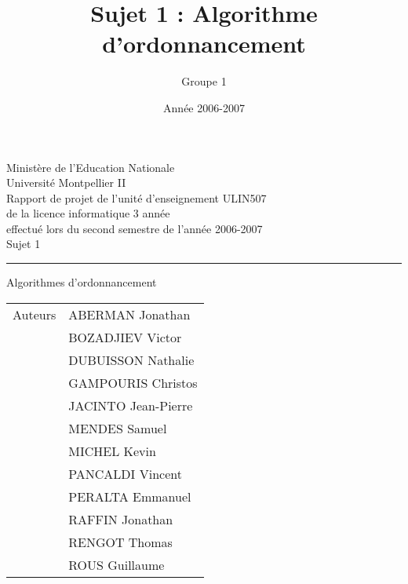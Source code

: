 \documentclass[A4]{report}
\title{Sujet 1 : Algorithme d'ordonnancement}
\author{Groupe 1}
\date{Année 2006-2007}
\theoremstyle{remark}
\newcommand{\sups}[1]{\raisebox{1ex}{\small #1}}
\begin{document}
\begin{titlepage}
\begin{center}
{\large
Ministère de l'Education Nationale \\
\vspace{0.8cm}
Université Montpellier II \\
\vspace{1.5cm}
Rapport de projet de l'unité d'enseignement ULIN507 \\
de la licence informatique 3\sups{ème} année \\
effectué lors du second semestre de l'année 2006-2007 \\
}
\vspace{4cm}
{\huge Sujet 1 }\\
\vspace{0.2cm}
\hrule
\vspace{0.2cm}
{\Huge Algorithmes d'ordonnancement}
\vspace{7cm}
\end{center}
\begin{flushright}
{\raggedleft
\begin{tabular}{r|l}
Auteurs & ABERMAN Jonathan \\
& BOZADJIEV Victor \\
& DUBUISSON Nathalie \\
& GAMPOURIS Christos \\
& JACINTO Jean-Pierre \\
& MENDES Samuel \\
& MICHEL Kevin \\
& PANCALDI Vincent \\
& PERALTA Emmanuel \\
& RAFFIN Jonathan \\
& RENGOT Thomas \\
& ROUS Guillaume \\
\end{tabular}
}
\end{flushright}
\end{titlepage}
\tableofcontents






\end{document}
